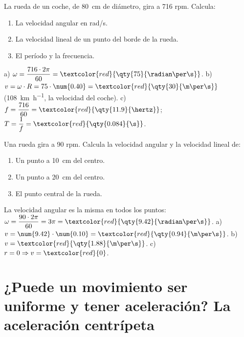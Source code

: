 \begin{exercise}
    La rueda de un coche, de \qty{80}{\cm} de diámetro, gira a 716 rpm. Calcula:
    \begin{enumerate}[label=\alph*)]
        \item La velocidad angular en rad/s.
        \item La velocidad lineal de un punto del borde de la rueda.
        \item El período y la frecuencia.
    \end{enumerate}
    \begin{solu}
        a) \(\omega = \dfrac{716 \cdot 2\pi}{60} = \textcolor{red}{\qty{75}{\radian\per\s}}\). b) \(v = \omega \cdot R = 75 \cdot \num{0.40} = \textcolor{red}{\qty{30}{\m\per\s}}\) (\qty{108}{\km\per\hour}, la velocidad del coche). c) \(f = \dfrac{716}{60} = \textcolor{red}{\qty{11.9}{\hertz}}\); \(T = \dfrac{1}{f} = \textcolor{red}{\qty{0.084}{\s}}\).
    \end{solu}
\end{exercise}

\begin{exercise}
    Una rueda gira a 90 rpm. Calcula la velocidad angular y la velocidad lineal de:
    \begin{enumerate}[label=\alph*)]
        \item Un punto a \qty{10}{\cm} del centro.
        \item Un punto a \qty{20}{\cm} del centro.
        \item El punto central de la rueda.
    \end{enumerate}
    \begin{solu}
        La velocidad angular es la misma en todos los puntos: \(\omega = \dfrac{90 \cdot 2\pi}{60} = 3\pi = \textcolor{red}{\qty{9.42}{\radian\per\s}}\).
        a) \(v = \num{9.42} \cdot \num{0.10} = \textcolor{red}{\qty{0.94}{\m\per\s}}\). b) \(v = \textcolor{red}{\qty{1.88}{\m\per\s}}\). c) \(r = 0 \Rightarrow v = \textcolor{red}{0}\).
    \end{solu}
\end{exercise}

\section[La aceleración centrípeta]{¿Puede un movimiento ser uniforme y tener aceleración? La aceleración centrípeta}


